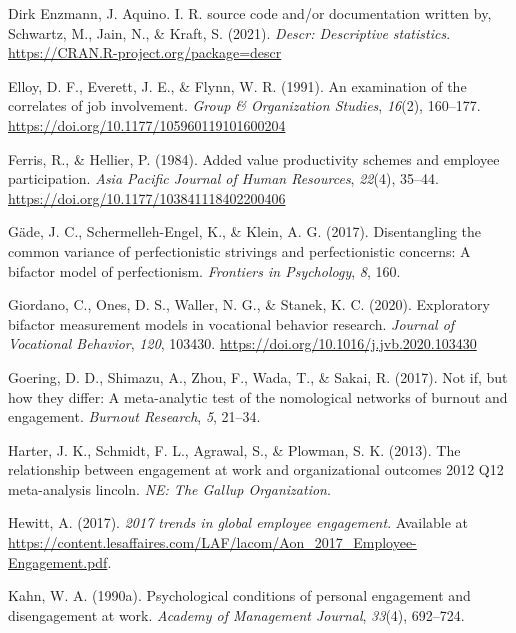 \documentclass[
  man]{apa6}
\newlength{\cslhangindent}
\newlength{\cslentryspacingunit} %
\newenvironment{CSLReferences}[2] %
 {%
  \setlength{\parindent}{0pt}
  \ifodd #1
  \let\oldpar\par
  \def\par{\hangindent=\cslhangindent\oldpar}
  \fi
  \setlength{\parskip}{#2\cslentryspacingunit}
 }%
 {}
\begin{document}
\begin{CSLReferences}{1}{0}
\leavevmode{}%
Dirk Enzmann, J. Aquino. I. R. source code and/or documentation written by, Schwartz, M., Jain, N., \& Kraft, S. (2021). \emph{Descr: Descriptive statistics}. \url{https://CRAN.R-project.org/package=descr}

\leavevmode{}%
Elloy, D. F., Everett, J. E., \& Flynn, W. R. (1991). An examination of the correlates of job involvement. \emph{Group \& Organization Studies}, \emph{16}(2), 160--177. \url{https://doi.org/10.1177/105960119101600204}

\leavevmode{}%
Ferris, R., \& Hellier, P. (1984). Added value productivity schemes and employee participation. \emph{Asia Pacific Journal of Human Resources}, \emph{22}(4), 35--44. \url{https://doi.org/10.1177/103841118402200406}

\leavevmode{}%
Gäde, J. C., Schermelleh-Engel, K., \& Klein, A. G. (2017). Disentangling the common variance of perfectionistic strivings and perfectionistic concerns: A bifactor model of perfectionism. \emph{Frontiers in Psychology}, \emph{8}, 160.

\leavevmode{}%
Giordano, C., Ones, D. S., Waller, N. G., \& Stanek, K. C. (2020). Exploratory bifactor measurement models in vocational behavior research. \emph{Journal of Vocational Behavior}, \emph{120}, 103430. \url{https://doi.org/10.1016/j.jvb.2020.103430}

\leavevmode{}%
Goering, D. D., Shimazu, A., Zhou, F., Wada, T., \& Sakai, R. (2017). Not if, but how they differ: A meta-analytic test of the nomological networks of burnout and engagement. \emph{Burnout Research}, \emph{5}, 21--34.

\leavevmode{}%
Harter, J. K., Schmidt, F. L., Agrawal, S., \& Plowman, S. K. (2013). The relationship between engagement at work and organizational outcomes 2012 Q12 meta-analysis lincoln. \emph{{NE}: The Gallup Organization}.

\leavevmode{}%
Hewitt, A. (2017). \emph{2017 trends in global employee engagement}. Available at \url{https://content.lesaffaires.com/LAF/lacom/Aon_2017_Employee-Engagement.pdf}.

\leavevmode{}%
Kahn, W. A. (1990a). Psychological conditions of personal engagement and disengagement at work. \emph{Academy of Management Journal}, \emph{33}(4), 692--724.


\end{CSLReferences}
\end{document}
